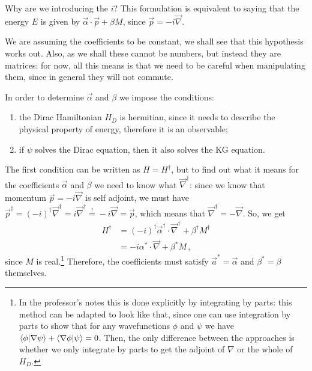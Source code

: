 \documentclass[main.tex]{subfiles}
\begin{document}
Why are we introducing the \(i\)? This formulation is equivalent to saying that the energy \(E\) is given by \(\vec{\alpha} \cdot \vec{p} + \beta M\), since \(\vec{p} = - i \vec{\nabla}\). 

We are assuming the coefficients to be constant, we shall see that this hypothesis works out. Also, as we shall these cannot be numbers, but instead they are matrices: for now, all this means is that we need to be careful when manipulating them, since in general they will not commute. 

In order to determine \(\vec{\alpha }\) and \(\beta \) we impose the conditions: 
\begin{enumerate}
  \item the Dirac Hamiltonian \(H_D\) is hermitian, since it needs to describe the physical property of energy, therefore it is an observable;
  \item if \(\psi \) solves the Dirac equation, then it also solves the KG equation. 
\end{enumerate}


The first condition can be written as \(H = H ^\dag\), but to find out what it means for the coefficients \(\vec{\alpha }\) and \(\beta \) we need to know what \(\vec{\nabla} ^\dag\): since we know that momentum \(\vec{p} = -i \vec{\nabla}\) is self adjoint, we must have \(\vec{p} ^\dag = (-i) ^\dag \vec{\nabla} ^\dag = i \vec{\nabla} ^\dag \overset{!}{=} -i \vec{\nabla} = \vec{p} \),
which means that \(\vec{\nabla} ^\dag = - \vec{\nabla}\).
So, we get 
%
\begin{subequations}
\begin{align}
H ^\dag &= (-i) ^\dag \vec{\alpha} ^\dag \cdot \vec{\nabla} ^\dag + \beta ^\dag M ^\dag  \\
&= -i \alpha^{*} \cdot \vec{\nabla} + \beta^{*} M
\,,
\end{align}
\end{subequations}
%
since \(M\) is real.\footnote{In the professor's notes this is done explicitly by integrating by parts: this method can be adapted to look like that, since one can use integration by parts to show that for any wavefunctions \(\phi \) and \(\psi \) we have \(\braket{\phi }{\nabla \psi } + \braket{\nabla \phi}{\psi } = 0\). Then, the only difference between the approaches is whether we only integrate by parts to get the adjoint of \(\nabla\) or the whole of \(H_D\). }
Therefore, the coefficients must satisfy \(\vec{a}^{*} = \vec{\alpha}\) and \(\beta^{*} = \beta \) themselves. 
\end{document}
